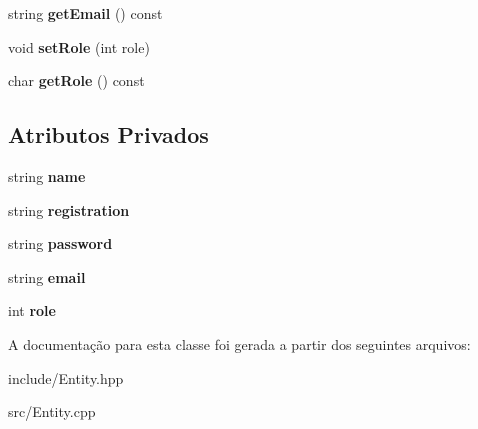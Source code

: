 \begin{DoxyCompactItemize}
\item 
string {\bfseries get\+Email} () const \hypertarget{classDeveloper_a73abbdbc5bfab2937b61844411049779}{}\label{classDeveloper_a73abbdbc5bfab2937b61844411049779}

\item 
void {\bfseries set\+Role} (int role)\hypertarget{classDeveloper_a7574f4cb294e807aa15ae23cc0e7c9dc}{}\label{classDeveloper_a7574f4cb294e807aa15ae23cc0e7c9dc}

\item 
char {\bfseries get\+Role} () const \hypertarget{classDeveloper_aac103d35519d584617e5a33cec5b784d}{}\label{classDeveloper_aac103d35519d584617e5a33cec5b784d}

\end{DoxyCompactItemize}
\subsection*{Atributos Privados}
\begin{DoxyCompactItemize}
\item 
string {\bfseries name}\hypertarget{classDeveloper_a0398c537a81a118c0cebd64e453554a8}{}\label{classDeveloper_a0398c537a81a118c0cebd64e453554a8}

\item 
string {\bfseries registration}\hypertarget{classDeveloper_a5ef51a2734630fffce6397c34803ce28}{}\label{classDeveloper_a5ef51a2734630fffce6397c34803ce28}

\item 
string {\bfseries password}\hypertarget{classDeveloper_ae32f57c369b15c92c1313a6f8e1abe81}{}\label{classDeveloper_ae32f57c369b15c92c1313a6f8e1abe81}

\item 
string {\bfseries email}\hypertarget{classDeveloper_ab5f333efe22566f8a685cfe396a003eb}{}\label{classDeveloper_ab5f333efe22566f8a685cfe396a003eb}

\item 
int {\bfseries role}\hypertarget{classDeveloper_a807d3a8dc4749ffd467caeb88d2cf859}{}\label{classDeveloper_a807d3a8dc4749ffd467caeb88d2cf859}

\end{DoxyCompactItemize}


A documentação para esta classe foi gerada a partir dos seguintes arquivos\+:\begin{DoxyCompactItemize}
\item 
include/Entity.\+hpp\item 
src/Entity.\+cpp\end{DoxyCompactItemize}

